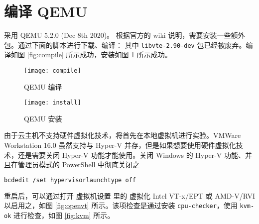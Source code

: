 



    \section{编译 QEMU}
    采用 QEMU 5.2.0 (Dec 8th 2020)。
    根据官方的 wiki 说明\cite{installwiki}，需要安装一些额外包。通过下面的脚本进行下载、编译：
    其中 \verb"libvte-2.90-dev" 包已经被废弃。编译如图 \ref{fig:compile} 所示成功，安装如图 \ref{fig:install} 所示成功。
    \begin{figure}[h]
        \centering
        \begin{minipage}{0.48\textwidth}
            \centering
            \texttt{[image: compile]}
            \caption{QEMU 编译}\label{fig:compile}
        \end{minipage}
        \begin{minipage}{0.48\textwidth}
            \texttt{[image: install]}
            \caption{QEMU 安装}\label{fig:install}
        \end{minipage}
    \end{figure}


     由于云主机不支持硬件虚拟化技术，将首先在本地虚拟机进行实验。VMWare Workstation 16.0 虽然支持与 Hyper-V 并存，但是如果想要使用硬件虚拟化技术，还是需要关闭 Hyper-V 功能才能使用。关闭 Windows 的 Hyper-V 功能、并且在管理员模式的 PowerShell 中彻底关闭之
\begin{lstlisting}[style=commandshell,language=bash]
bcdedit /set hypervisorlaunchtype off
\end{lstlisting}
    重启后，可以通过打开 \textsf{虚拟机设置} 里的 \textsf{虚拟化 Intel VT-x/EPT 或 AMD-V/RVI} 以启用之，如图 \ref{fig:openvt} 所示。该项检查是通过安装 \verb"cpu-checker"，使用 \verb"kvm-ok" 进行检查，如图 \ref{fig:kvm} 所示。

